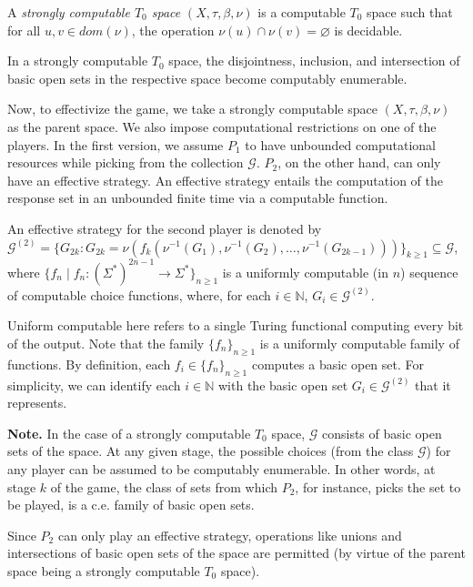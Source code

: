 \documentclass[a4paper,UKenglish,autoref,thm-restate,numberwithinsect]{lipics-v2021}
\newcommand{\N}{\mathbb{N}}
\begin{document}
\begin{definition}
	A \emph{strongly computable $T_0$ space} $(X,\tau,\beta,\nu)$ is a computable $T_0$ space such that for all $u,v\in dom(\nu)$, the operation $\nu(u)\cap\nu(v)=\varnothing$ is decidable. 
\end{definition}

In a strongly computable $T_0$ space, the disjointness, inclusion, and intersection of basic open sets in the respective space become computably enumerable. 

Now, to effectivize the game, we take a strongly computable space $(X,\tau,\beta,\nu)$ as the parent space. We also impose computational restrictions on one of the players. In the first version, we assume $P_1$ to have unbounded computational resources while picking from the collection $\mathcal{G}$. $P_2$, on the other hand, can only have an effective strategy. An effective strategy entails the computation of the response set in an unbounded finite time via a computable function. 

\begin{definition}
	An effective strategy for the second player is denoted by $\mathcal{G}^{(2)} = \{G_{2k}:G_{2k}=\nu(f_k\left(\nu^{-1}(G_1),\nu^{-1}(G_2),\ldots,\nu^{-1}(G_{2k-1})\right))\}_{k\geq1}\subseteq \mathcal{G}$, where $\{f_n\mid f_n:(\Sigma^*)^{2n-1}\to\Sigma^*\}_{n\geq1}$ is a uniformly computable (in $n$) sequence of computable choice functions, where, for each $i\in\N$, $G_i\in\mathcal{G}^{(2)}$. 
\end{definition}

Uniform computable here refers to a single Turing functional computing every bit of the output. Note that the family $\{f_n\}_{n\geq1}$ is a uniformly computable family of functions. By definition, each $f_i\in\{f_n\}_{n\geq1}$ computes a basic open set. For simplicity, we can identify each $i\in\mathbb{N}$ with the basic open set $G_i\in\mathcal{G}^{(2)}$ that it represents. 

\textbf{Note.} In the case of a strongly computable $T_0$ space, $\mathcal{G}$ consists of basic open sets of the space. At any given stage, the possible choices (from the class $\mathcal{G}$) for any player can be assumed to be computably enumerable. In other words, at stage $k$ of the game, the class of sets from which $P_2$, for instance, picks the set to be played, is a c.e. family of basic open sets. 

Since $P_2$ can only play an effective strategy, operations like unions and intersections of basic open sets of the space are permitted (by virtue of the parent space being a strongly computable $T_0$ space). 
\end{document}

